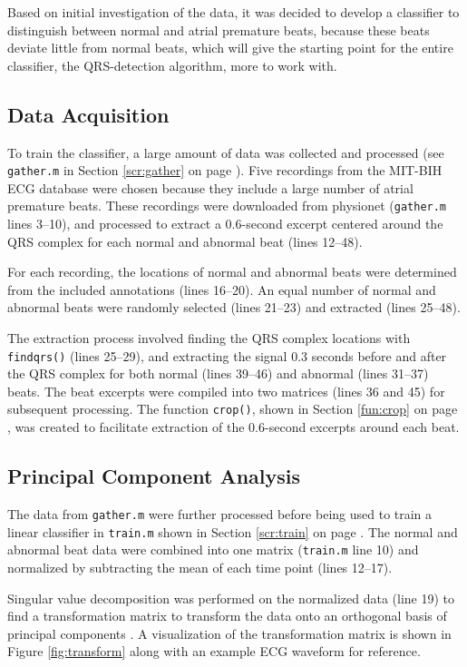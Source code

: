 \documentclass[titlepage,12pt,letter]{article}
\newcommand{\rpref}[1]{\ref{#1} on page \pageref{#1}}
\begin{document}
Based on initial investigation of the data, it was decided to develop a
classifier to distinguish between normal and atrial premature beats, because
these beats deviate little from normal beats, which will give the starting point
for the entire classifier, the QRS-detection algorithm, more to work with.  

\subsection{Data Acquisition}
To train the classifier, a large amount of data was collected and processed (see
\verb`gather.m` in Section \rpref{scr:gather}).  Five recordings from the
MIT-BIH ECG database were chosen because they include a large number of atrial
premature beats.  These recordings were downloaded from physionet
(\verb`gather.m` lines 3--10), and processed to extract a 0.6-second excerpt
centered around the QRS complex for each normal and abnormal beat (lines
12--48).  

For each recording, the locations of normal and abnormal beats were determined
from the included annotations (lines 16--20).  An equal number of normal and
abnormal beats were randomly selected (lines 21--23) and extracted (lines
25--48).  

The extraction process involved finding the QRS complex locations with
\verb`findqrs()` (lines 25--29), and extracting the signal 0.3 seconds before
and after the QRS complex for both normal (lines 39--46) and abnormal (lines
31--37) beats.  The beat excerpts were compiled into two matrices (lines 36 and
45) for subsequent processing.  The function \verb`crop()`, shown in Section
\rpref{fun:crop}, was created to facilitate extraction of the 0.6-second
excerpts around each beat.  

\subsection{Principal Component Analysis}
The data from \verb`gather.m` were further processed before being used to train
a linear classifier in \verb`train.m` shown in Section \rpref{scr:train}.  The
normal and abnormal beat data were combined into one matrix (\verb`train.m` line
10) and normalized by subtracting the mean of each time point (lines 12--17).

Singular value decomposition was performed on the normalized data (line 19) to
find a transformation matrix to transform the data onto an orthogonal basis of
principal components \cite{Shlens14}.  A visualization of the transformation
matrix is shown in Figure \ref{fig:transform} along with an example ECG waveform
for reference.  
\end{document}
